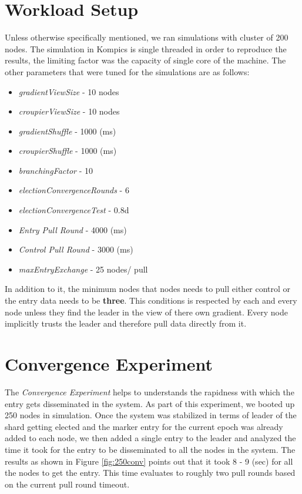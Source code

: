 \documentclass[12pt,a4paper,twoside,openright]{book}
\begin{document}
\section{Workload Setup}

Unless otherwise specifically mentioned, we ran simulations with cluster of 200 nodes. The simulation in Kompics is single threaded in order to reproduce the results, the limiting factor was the capacity of single core of the machine. The other parameters that were tuned for the simulations are as follows:

\begin{itemize}
\setlength\itemsep{0em}
\item \textit{gradientViewSize} - 10 nodes
\item \textit{croupierViewSize} - 10 nodes
\item \textit{gradientShuffle} - 1000 (ms)
\item \textit{croupierShuffle} - 1000 (ms)
\item \textit{branchingFactor} - 10
\item \textit{electionConvergenceRounds} - 6
\item \textit{electionConvergenceTest} - 0.8d
\item \textit{Entry Pull Round} - 4000 (ms)
\item \textit{Control Pull Round} - 3000 (ms)
\item \textit{maxEntryExchange} - 25 nodes/ pull
\end{itemize}

In addition to it, the minimum nodes that nodes needs to pull either control or the entry data needs to be \textbf{three}. This conditions is respected by each and every node unless they find the leader in the view of there own gradient. Every node implicitly trusts the leader and therefore pull data directly from it.




\section{Convergence Experiment}

The \textit{Convergence Experiment} helps to understands the rapidness with which the entry gets disseminated in the system. As part of this experiment, we booted up 250 nodes in simulation. Once the system was stabilized in terms of leader of the shard getting elected and the marker entry for the current epoch was already added to each node, we then added a single entry to the leader and analyzed the time it took for the entry to be disseminated to all the nodes in the system. The results as shown in Figure \ref{fig:250conv} points out that it took 8 - 9 (sec) for all the nodes to get the entry. This time evaluates to roughly two pull rounds based on the current pull round timeout.
\end{document}
